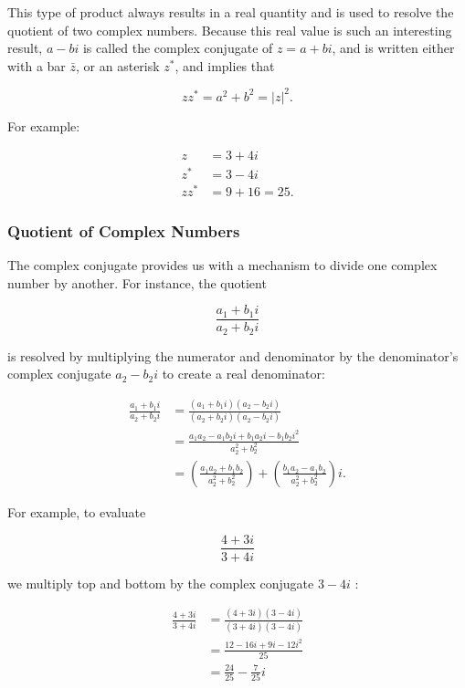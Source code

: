 \documentclass[10pt]{article}
\begin{document}
This type of product always results in a real quantity and is used to resolve the quotient of two complex numbers. Because this real value is such an interesting result, $a-b i$ is called the complex conjugate of $z=a+b i$, and is written either with a bar $\bar{z}$, or an asterisk $z^{*}$, and implies that

$$
z z^{*}=a^{2}+b^{2}=|z|^{2} .
$$

For example:

$$
\begin{aligned}
z & =3+4 i \\
z^{*} & =3-4 i \\
z z^{*} & =9+16=25 .
\end{aligned}
$$

\subsubsection{Quotient of Complex Numbers}
The complex conjugate provides us with a mechanism to divide one complex number by another. For instance, the quotient

$$
\frac{a_{1}+b_{1} i}{a_{2}+b_{2} i}
$$

is resolved by multiplying the numerator and denominator by the denominator's complex conjugate $a_{2}-b_{2} i$ to create a real denominator:

$$
\begin{aligned}
\frac{a_{1}+b_{1} i}{a_{2}+b_{2} i} & =\frac{\left(a_{1}+b_{1} i\right)\left(a_{2}-b_{2} i\right)}{\left(a_{2}+b_{2} i\right)\left(a_{2}-b_{2} i\right)} \\
& =\frac{a_{1} a_{2}-a_{1} b_{2} i+b_{1} a_{2} i-b_{1} b_{2} i^{2}}{a_{2}^{2}+b_{2}^{2}} \\
& =\left(\frac{a_{1} a_{2}+b_{1} b_{2}}{a_{2}^{2}+b_{2}^{2}}\right)+\left(\frac{b_{1} a_{2}-a_{1} b_{2}}{a_{2}^{2}+b_{2}^{2}}\right) i .
\end{aligned}
$$

For example, to evaluate

$$
\frac{4+3 i}{3+4 i}
$$

we multiply top and bottom by the complex conjugate $3-4 i$ :

$$
\begin{aligned}
\frac{4+3 i}{3+4 i} & =\frac{(4+3 i)(3-4 i)}{(3+4 i)(3-4 i)} \\
& =\frac{12-16 i+9 i-12 i^{2}}{25} \\
& =\frac{24}{25}-\frac{7}{25} i
\end{aligned}
$$
\end{document}
